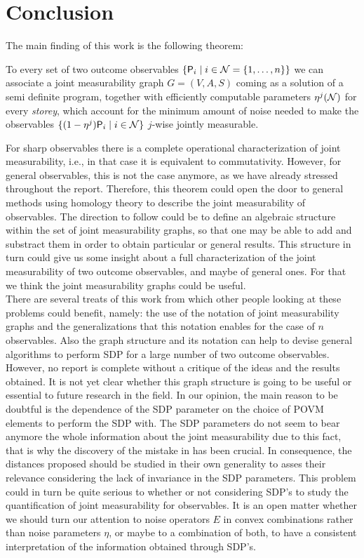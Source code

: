 \documentclass[10pt, a4paper]{amsart}
\begin{document}
\section{Conclusion}
The main finding of this work is the following theorem:
\begin{theorem}
To every set of two outcome observables $\{\mathsf{P}_{i}\mid i\in \mathcal{N} = \{1,\ldots , n\}\}$ we can associate a joint measurability graph $G = (V,A,S)$ coming as a solution of a semi definite program, together with efficiently computable parameters $\eta^{j}(\mathcal{N})$ for every \textit{storey}, which account for the minimum amount of noise needed to make the observables $\{(1-\eta^{j})\mathsf{P}_{i}\mid i\in\mathcal{N}\}$ $j$-wise jointly measurable. 
\end{theorem}
For sharp observables there is a complete operational characterization of joint measurability, i.e., in that case it is equivalent to commutativity. 
However, for general observables, this is not the case anymore, as we have already stressed throughout the report. Therefore,
this theorem could open the door to general methods using homology theory to describe the joint measurability of observables. The direction to follow could be to define an algebraic structure within the set of joint measurability graphs, so that one may be able to add and substract them in order to obtain particular or general results. This structure in turn could give us some insight about a full characterization of the joint measurability of two outcome observables, and maybe of general ones. For that we think the joint measurability graphs could be useful.\\
There are several treats of this work from which other people looking at these problems could benefit, namely:
the use of the notation of joint measurability graphs and the generalizations that this notation enables for the case of $n$ observables. Also the graph structure and its notation can help to devise general algorithms to perform SDP for a large number of two outcome observables. \\
However, no report is complete without a critique of the ideas and the results obtained. It is not yet clear whether this graph structure is going to be useful or essential to future research in the field. In our opinion, the main reason to be doubtful is the dependence of the SDP parameter on the choice of POVM elements to perform the SDP with. The SDP parameters do not seem  to bear anymore the whole information about the joint measurability due to this fact, that is why the discovery of the mistake in \cite{wolfgarcia} has been crucial. In consequence, the distances proposed should be studied in their own generality to asses their relevance considering the lack of invariance in the SDP parameters. This problem could in turn be quite serious to whether or not considering SDP's to study the quantification of joint measurability for observables. It is an open matter whether we should turn our attention to noise operators $E$ in convex combinations rather than noise parameters $\eta$, or maybe to a combination of both, to have a consistent interpretation of the information obtained through SDP's. 
\end{document}

